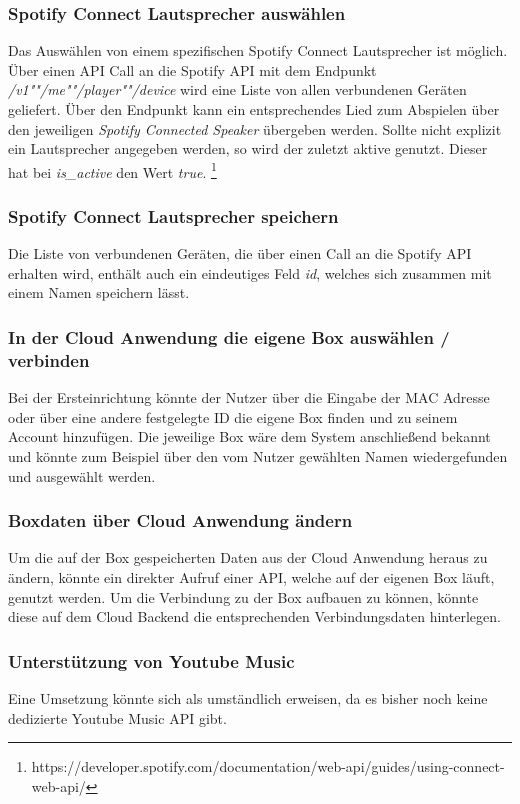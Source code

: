 \documentclass[10pt, a4paper, draft]{article}
\begin{document}
\subsubsection{Spotify Connect Lautsprecher auswählen}
Das Auswählen von einem spezifischen Spotify Connect Lautsprecher ist möglich.
Über einen API Call an die Spotify API mit dem Endpunkt \textit{/v1""/me""/player""/device} wird eine Liste von allen verbundenen Geräten geliefert. Über den Endpunkt kann ein entsprechendes Lied zum Abspielen über den jeweiligen \textit{Spotify Connected Speaker} übergeben werden.
Sollte nicht explizit ein Lautsprecher angegeben werden, so wird der zuletzt aktive genutzt. Dieser hat bei \textit{is\_active} den Wert \textit{true}. \footnote{https://developer.spotify.com/documentation/web-api/guides/using-connect-web-api/}

\subsubsection{Spotify Connect Lautsprecher speichern}
Die Liste von verbundenen Geräten, die über einen Call an die Spotify API erhalten wird, enthält auch ein eindeutiges Feld \textit{id}, welches sich zusammen mit einem Namen speichern lässt.

\subsubsection{In der Cloud Anwendung die eigene Box auswählen / verbinden}
Bei der Ersteinrichtung könnte der Nutzer über die Eingabe der MAC Adresse oder über eine andere festgelegte ID die eigene Box finden und zu seinem Account hinzufügen. Die jeweilige Box wäre dem System anschließend bekannt und könnte zum Beispiel über den vom Nutzer gewählten Namen wiedergefunden und ausgewählt werden.

\subsubsection{Boxdaten über Cloud Anwendung ändern}
Um die auf der Box gespeicherten Daten aus der Cloud Anwendung heraus zu ändern, könnte ein direkter Aufruf einer API, welche auf der eigenen Box läuft, genutzt werden. Um die Verbindung zu der Box aufbauen zu können, könnte diese auf dem Cloud Backend die entsprechenden Verbindungsdaten hinterlegen.
\subsubsection{Unterstützung von Youtube Music}
Eine Umsetzung könnte sich als umständlich erweisen, da es bisher noch keine dedizierte Youtube Music API gibt.
\end{document}
